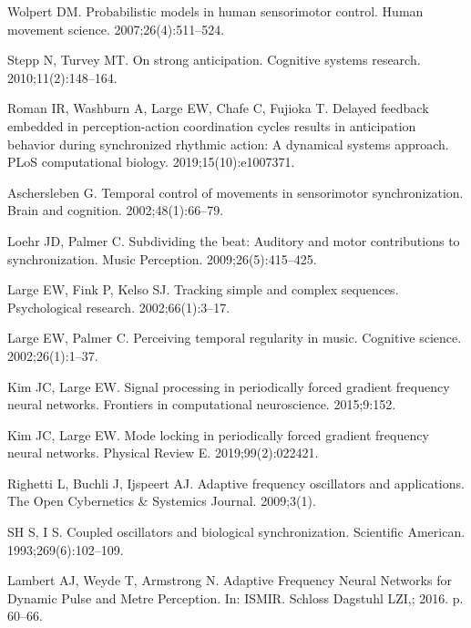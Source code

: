 \documentclass[10pt,letterpaper]{article}
\begin{document}
\begin{thebibliography}{10}
Wolpert DM.
\newblock Probabilistic models in human sensorimotor control.
\newblock Human movement science. 2007;26(4):511--524.

Stepp N, Turvey MT.
\newblock On strong anticipation.
\newblock Cognitive systems research. 2010;11(2):148--164.

Roman IR, Washburn A, Large EW, Chafe C, Fujioka T.
\newblock Delayed feedback embedded in perception-action coordination cycles
  results in anticipation behavior during synchronized rhythmic action: A
  dynamical systems approach.
\newblock PLoS computational biology. 2019;15(10):e1007371.

Aschersleben G.
\newblock Temporal control of movements in sensorimotor synchronization.
\newblock Brain and cognition. 2002;48(1):66--79.

Loehr JD, Palmer C.
\newblock Subdividing the beat: Auditory and motor contributions to
  synchronization.
\newblock Music Perception. 2009;26(5):415--425.

Large EW, Fink P, Kelso SJ.
\newblock Tracking simple and complex sequences.
\newblock Psychological research. 2002;66(1):3--17.

Large EW, Palmer C.
\newblock Perceiving temporal regularity in music.
\newblock Cognitive science. 2002;26(1):1--37.

Kim JC, Large EW.
\newblock Signal processing in periodically forced gradient frequency neural
  networks.
\newblock Frontiers in computational neuroscience. 2015;9:152.

Kim JC, Large EW.
\newblock Mode locking in periodically forced gradient frequency neural
  networks.
\newblock Physical Review E. 2019;99(2):022421.

Righetti L, Buchli J, Ijspeert AJ.
\newblock Adaptive frequency oscillators and applications.
\newblock The Open Cybernetics \& Systemics Journal. 2009;3(1).

SH S, I S.
\newblock Coupled oscillators and biological synchronization.
\newblock Scientific American. 1993;269(6):102--109.

Lambert AJ, Weyde T, Armstrong N.
\newblock Adaptive Frequency Neural Networks for Dynamic Pulse and Metre
  Perception.
\newblock In: ISMIR. Schloss Dagstuhl LZI,; 2016. p. 60--66.


\end{thebibliography}
\end{document}
